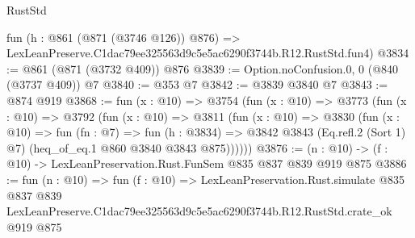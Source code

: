 \begin{lexlean}{RustStd}
\begin{coremodule}
    fun (h : @861 (@871 (@3746 @126)) @876) =>
    LexLeanPreserve.C1dac79ee325563d9c5e5ac6290f3744b.R12.RustStd.fun4)
@3834 := @861 (@871 (@3732 @409)) @876
@3839 := Option.noConfusion.{0, 0} (@840 (@3737 @409)) @7
@3840 := @353 @7
@3842 := @3839 @3840 @7
@3843 := @874 @919
@3868 := fun (x : @10) =>
  @3754
    (fun (x : @10) =>
    @3773
      (fun (x : @10) =>
      @3792
        (fun (x : @10) =>
        @3811
          (fun (x : @10) =>
          @3830
            (fun (x : @10) =>
            fun (fn : @7) =>
            fun (h : @3834) =>
            @3842 @3843 (Eq.refl.{2} (Sort 1) @7) (heq_of_eq.{1} @860 @3840 @3843 @875))))))
@3876 := (n : @10) -> (f : @10) -> LexLeanPreservation.Rust.FunSem @835 @837 @839 @919 @875
@3886 := fun (n : @10) =>
  fun (f : @10) =>
  LexLeanPreservation.Rust.simulate
    @835
    @837
    @839
    LexLeanPreserve.C1dac79ee325563d9c5e5ac6290f3744b.R12.RustStd.crate_ok
    @919
    @875
\end{coremodule}
\end{lexlean}
